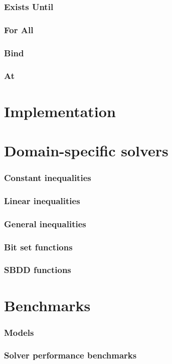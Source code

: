 	\subsection{Exists Until}
	\subsection{For All}
	\subsection{Bind}
	\subsection{At}

\chapter{Implementation}

\chapter{Domain-specific solvers}
	\subsection{Constant inequalities}
	\subsection{Linear inequalities}
	\subsection{General inequalities}
	\subsection{Bit set functions}
	\subsection{SBDD functions}

\chapter{Benchmarks}
	\subsection{Models}
	\subsection{Solver performance benchmarks}
